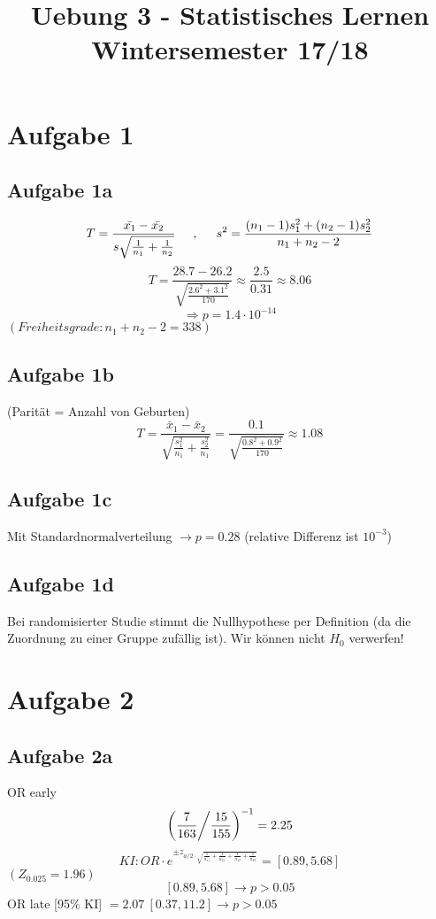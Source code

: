 \documentclass[10pt,a4paper]{article}
\title{Uebung 3 - Statistisches Lernen\\ \large{Wintersemester 17/18}}
\date{}
\begin{document}
	\maketitle
\section{Aufgabe 1}
\subsection{Aufgabe 1a}
\[ T = \frac{\bar{x_1} - \bar{x_2}}{s \sqrt{\frac{1}{n_1} + \frac{1}{n_2}}} \hspace{0.5cm},\hspace{0.5cm} s^2 = \frac{(n_1 - 1) s_1^2 + (n_2 -1) s_2^2}{n_1 + n_2 -2} \]
\[ T = \frac{28.7 - 26.2}{\sqrt{\frac{2.6^2 + 3.1^2}{170}}} \approx \frac{2.5}{0.31} \approx 8.06 \]
\[ \Rightarrow p= 1.4 \cdot 10^{-14} \]
$(Freiheitsgrade: n_1 + n_2 -2 = 338)$ \\

\subsection{Aufgabe 1b}
(Parität = Anzahl von Geburten) 
\[ T = \frac{\bar{x}_1 - \bar{x}_2 }{\sqrt{\frac{s_1^2}{n_1} + \frac{s_2^2}{n_1}}} = \frac{0.1}{\sqrt{\frac{0.8^2 + 0.9^2}{170}}} \approx 1.08 \]

\subsection{Aufgabe 1c}
Mit Standardnormalverteilung $\rightarrow p=0.28$ (relative Differenz ist $10^{-3}$)

\subsection{Aufgabe 1d}
Bei randomisierter Studie stimmt die Nullhypothese per Definition (da die Zuordnung zu einer Gruppe zufällig ist). Wir können nicht $H_0$ verwerfen!

\section{Aufgabe 2}
\subsection{Aufgabe 2a}
OR early
\[ \left(\frac{7}{163} \middle/ \frac{15}{155} \right)^{-1} = 2.25  \] 
\vspace{1cm}
\[KI: OR \cdot e^{\pm z_{a/2 \cdot \sqrt{\frac{1}{n_{11}} + \frac{1}{n_{21}} + \frac{1}{n_{12}} + \frac{1}{n_{22}}}}} = [0.89,5.68] \]
$(Z_{0.025}=1.96)$
\[ [0.89,5.68] \rightarrow p > 0.05 \] 
OR late [95\% KI] $= 2.07 \ [0.37,11.2] \rightarrow p > 0.05 $
\end{document}
